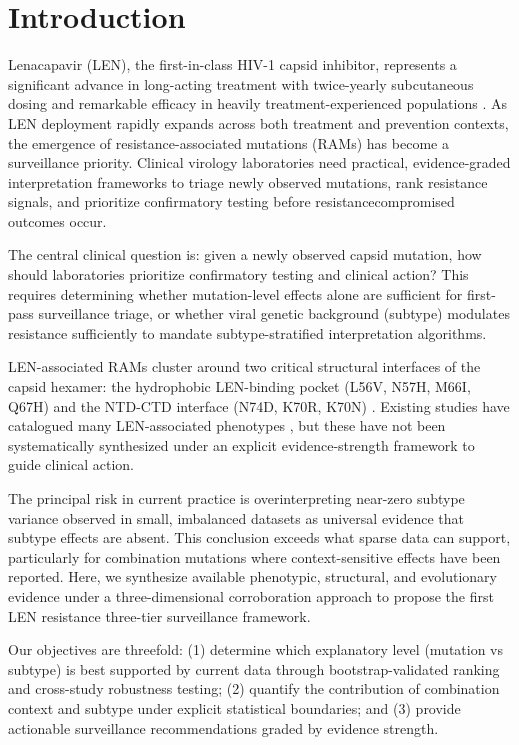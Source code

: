 \documentclass[12pt,a4paper]{article}
\begin{document}
\section{Introduction}

Lenacapavir (LEN), the first-in-class HIV-1 capsid inhibitor, represents a significant advance in long-acting treatment with twice-yearly subcutaneous dosing and remarkable efficacy in heavily treatment-experienced populations \cite{Link2020,SegalMaurer2022}. As LEN deployment rapidly expands across both treatment and prevention contexts, the emergence of resistance-associated mutations (RAMs) has become a surveillance priority. Clinical virology laboratories need practical, evidence-graded interpretation frameworks to triage newly observed mutations, rank resistance signals, and prioritize confirmatory testing before resistancecompromised outcomes occur.

The central clinical question is: given a newly observed capsid mutation, how should laboratories prioritize confirmatory testing and clinical action? This requires determining whether mutation-level effects alone are sufficient for first-pass surveillance triage, or whether viral genetic background (subtype) modulates resistance sufficiently to mandate subtype-stratified interpretation algorithms.

LEN-associated RAMs cluster around two critical structural interfaces of the capsid hexamer: the hydrophobic LEN-binding pocket (L56V, N57H, M66I, Q67H) and the NTD-CTD interface (N74D, K70R, K70N) \cite{Yant2022,Margot2025}. Existing studies have catalogued many LEN-associated phenotypes \cite{Andreatta2024}, but these have not been systematically synthesized under an explicit evidence-strength framework to guide clinical action.

The principal risk in current practice is overinterpreting near-zero subtype variance observed in small, imbalanced datasets as universal evidence that subtype effects are absent. This conclusion exceeds what sparse data can support, particularly for combination mutations where context-sensitive effects have been reported. Here, we synthesize available phenotypic, structural, and evolutionary evidence under a three-dimensional corroboration approach to propose the first LEN resistance three-tier surveillance framework.

Our objectives are threefold: (1) determine which explanatory level (mutation vs subtype) is best supported by current data through bootstrap-validated ranking and cross-study robustness testing; (2) quantify the contribution of combination context and subtype under explicit statistical boundaries; and (3) provide actionable surveillance recommendations graded by evidence strength.
\end{document}

